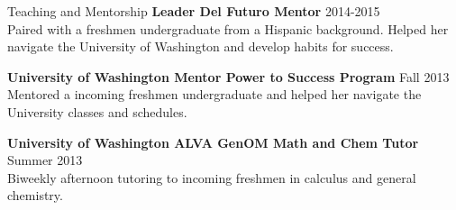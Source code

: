 \documentclass{resume} %
\begin{document}
\begin{rSection}{Teaching and Mentorship}
\textbf{Leader Del Futuro Mentor} \hfill 2014-2015 \\
Paired with a freshmen undergraduate from a Hispanic background. Helped 
her navigate the University of Washington and develop habits for success.	

\textbf{University of Washington Mentor Power to Success Program}			\hfill Fall 2013 \\
Mentored a incoming freshmen undergraduate and helped her navigate the 
University classes and schedules.

\textbf{University of Washington ALVA GenOM Math and Chem Tutor} \hfill Summer 2013 \\
Biweekly afternoon tutoring to incoming freshmen in calculus and 
general chemistry. 

\end{rSection}
\end{document}
